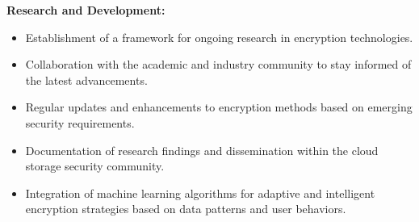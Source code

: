 \textbf{Research and Development:}
\begin{itemize}
  \item Establishment of a framework for ongoing research in encryption technologies.
\item Collaboration with the academic and industry community to stay informed of the latest
advancements.  
\item Regular updates and enhancements to encryption methods based on emerging security
requirements.   
\item Documentation of research findings and dissemination within the cloud storage security
community.   
\item Integration of machine learning algorithms for adaptive and intelligent encryption strategies based on data patterns and user behaviors. 
\end{itemize}


